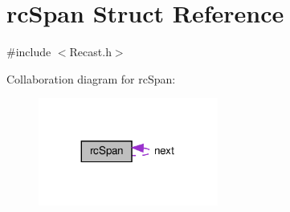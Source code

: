 \hypertarget{structrcSpan}{}\section{rc\+Span Struct Reference}
\label{structrcSpan}


{\ttfamily \#include $<$Recast.\+h$>$}



Collaboration diagram for rc\+Span\+:
\nopagebreak
\begin{figure}[H]
\begin{center}
\leavevmode
\includegraphics[width=167pt]{structrcSpan__coll__graph}
\end{center}
\end{figure}
